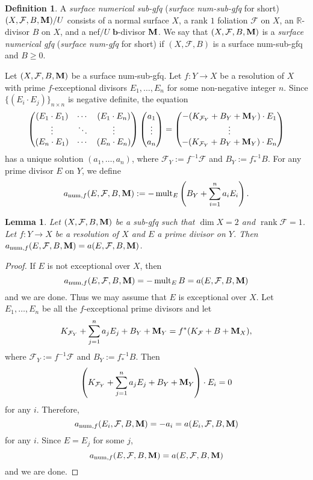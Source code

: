 \documentclass[11pt]{amsart}
\numberwithin{equation}{section}
\newcommand{\bb}{\bm{b}}
\newcommand{\Mm}{{\bf{M}}}
\newcommand{\Rr}{\mathbb{R}}
\newcommand{\rk}{\operatorname{rank}}
\newcommand{\num}{{\operatorname{num}}}
\newcommand{\mult}{\operatorname{mult}}
\newcommand{\Ff}{\mathcal{F}}
\newtheorem{lem}[thm]{Lemma}
\theoremstyle{definition}
\newtheorem{defn}[thm]{Definition}
\theoremstyle{definition}
\theoremstyle{definition}
\begin{document}
\begin{defn}\label{defn: num foliated sing}
A \emph{surface numerical sub-gfq} (\emph{surface num-sub-gfq} for short) $(X,\Ff,B,\Mm)/U$ consists of a normal surface $X$, a rank $1$ foliation $\Ff$ on $X$, an $\Rr$-divisor $B$ on $X$, and a nef$/U$ $\bb$-divisor $\Mm$. We say that $(X,\Ff,B,\Mm)$ is a \emph{surface numerical gfq} (\emph{surface num-gfq} for short) if  $(X,\Ff,B)$ is a surface num-sub-gfq and $B\geq 0$.

Let $(X,\Ff,B,\Mm)$ be a surface num-sub-gfq. Let $f: Y\rightarrow X$ be a resolution of $X$ with prime $f$-exceptional divisors $E_1,\dots,E_n$ for some non-negative integer $n$. Since $\{(E_i\cdot E_j)\}_{n\times n}$ is negative definite, the equation 
$$\begin{pmatrix}
  (E_1\cdot E_1) &\cdots & (E_1\cdot E_n) \\
  \vdots&\ddots & \vdots         \\
  (E_n\cdot E_1) &\cdots & (E_n\cdot E_n) \\
\end{pmatrix} 
\begin{pmatrix}
  a_1 \\
  \vdots \\
  a_n \\
\end{pmatrix} 
 =
 \begin{pmatrix}
-(K_{\Ff_Y}+B_Y+\Mm_Y)\cdot E_1\\
\vdots\\
-(K_{\Ff_Y}+B_Y+\Mm_Y)\cdot E_n\\
\end{pmatrix}$$
has a unique solution $(a_1,\dots,a_n)$, where $\Ff_Y:=f^{-1}\Ff$ and $B_Y:=f^{-1}_*B$. For any prime divisor $E$ on $Y$, we define 
$$a_{\num,f}(E,\Ff,B,\Mm):=-\mult_E\left(B_Y+\sum_{i=1}^n a_iE_i\right).$$
\end{defn}


\begin{lem}\label{lem: anum same as a}
Let $(X,\Ff,B,\Mm)$ be a sub-gfq such that $\dim X=2$ and $\rk\Ff=1$. Let $f: Y\rightarrow X$ be a resolution of $X$ and $E$ a prime divisor on $Y$. Then $a_{\num,f}(E,\Ff,B,\Mm)=a(E,\Ff,B,\Mm)$.
\end{lem}
\begin{proof}
If $E$ is not exceptional over $X$, then 
$$a_{\num,f}(E,\Ff,B,\Mm)=-\mult_EB=a(E,\Ff,B,\Mm)$$ 
and we are done. Thus we may assume that $E$ is exceptional over $X$. Let $E_1,\dots,E_n$ be all the $f$-exceptional prime divisors and let
$$K_{\Ff_Y}+\sum_{j=1}^na_jE_j+B_Y+\Mm_Y=f^*(K_{\Ff}+B+\Mm_X),$$
where $\Ff_Y:=f^{-1}\Ff$ and $B_Y:=f^{-1}_*B$. Then
$$\left(K_{\Ff_Y}+\sum_{j=1}^na_jE_j+B_Y+\Mm_Y\right)\cdot E_i=0$$
for any $i$. Therefore,
$$a_{\num,f}(E_i,\Ff,B,\Mm)=-a_i=a(E_i,\Ff,B,\Mm)$$ for any $i$. Since $E=E_j$ for some $j$, $$a_{\num,f}(E,\Ff,B,\Mm)=a(E,\Ff,B,\Mm)$$ and we are done.
\end{proof}
\end{document}

